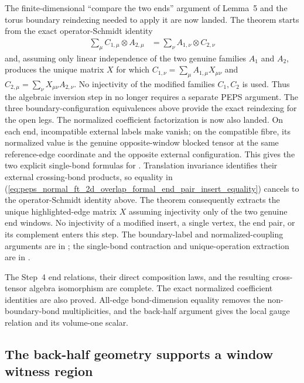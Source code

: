 \documentclass{article}
\begin{document}
The finite-dimensional ``compare the two ends'' argument of Lemma~5 and the
torus boundary reindexing needed to apply it are now landed.  The theorem
 starts from the exact
operator-Schmidt identity
\begin{align}
    \sum_\mu C_{1,\mu}\otimes A_{2,\mu}
     & = \sum_\nu A_{1,\nu}\otimes C_{2,\nu}
\end{align}
and, assuming only linear independence of the two genuine families $A_1$ and
$A_2$, produces the unique matrix $X$ for which
$C_{1,\nu}=\sum_\mu A_{1,\mu}X_{\mu\nu}$ and
$C_{2,\mu}=\sum_\nu X_{\mu\nu}A_{2,\nu}$.  No injectivity of the modified
families $C_1,C_2$ is used.  Thus the algebraic inversion step in
\cite[Lemma~5]{Molnar2018NormalPEPS} no longer requires a separate PEPS
argument.  The three boundary-configuration equivalences above provide the
exact reindexing for the open legs.  The normalized coefficient factorization
is now also landed.  On each end, incompatible external labels make
 vanish; on the compatible fibre,
its normalized value is the genuine opposite-window blocked tensor at the same
reference-edge coordinate and the opposite external configuration.  This gives
the two explicit single-bond formulas for .  Translation
invariance identifies their external crossing-bond products, so equality in
(\ref{eq:peps_normal_ft_2d_overlap_formal_end_pair_insert_equality}) cancels to
the operator-Schmidt identity above.  The theorem
 consequently
extracts the unique highlighted-edge matrix $X$ assuming injectivity only of
the two genuine end windows.  No injectivity of a modified insert, a single
vertex, the end pair, or its complement enters this step.
The boundary-label and normalized-coupling arguments are in
; the single-bond
contraction and unique-operation extraction are in
.

The Step~4 end relations, their direct composition laws, and the resulting
cross-tensor algebra isomorphism are complete. The exact normalized
coefficient identities are also proved. All-edge bond-dimension equality
removes the non-boundary-bond multiplicities, and the back-half argument
gives the local gauge relation and its volume-one scalar.

\subsection{The back-half geometry supports a window witness region}
\end{document}
